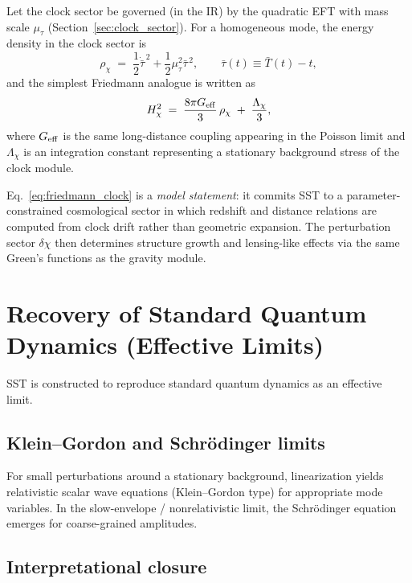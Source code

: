 \documentclass[10pt]{article}
\begin{document}
Let the clock sector be governed (in the IR) by the quadratic EFT with mass scale
$\mu_\tau$ (Section~\ref{sec:clock_sector}). For a homogeneous mode, the energy density
in the clock sector is
\begin{equation}
    \rho_\chi \;=\; \frac{1}{2}\dot{\bar{\tau}}^{\,2} + \frac{1}{2}\mu_\tau^2\bar{\tau}^{\,2},
    \qquad
    \bar{\tau}(t)\equiv \bar{T}(t)-t,
\end{equation}
and the simplest Friedmann analogue is written as
\begin{equation}
    H_\chi^2 \;=\; \frac{8\pi G_{\rm eff}}{3}\,\rho_\chi \;+\; \frac{\Lambda_\chi}{3},
    \label{eq:friedmann_clock}
\end{equation}
where $G_{\rm eff}$ is the same long-distance coupling appearing in the Poisson limit
and $\Lambda_\chi$ is an integration constant representing a stationary background
stress of the clock module.

Eq.~\eqref{eq:friedmann_clock} is a \emph{model statement}: it commits SST to a
parameter-constrained cosmological sector in which redshift and distance relations
are computed from clock drift rather than geometric expansion. The perturbation
sector $\delta\chi$ then determines structure growth and lensing-like effects via
the same Green's functions as the gravity module.


\section{Recovery of Standard Quantum Dynamics (Effective Limits)}
    \label{sec:qm_limits}

    SST is constructed to reproduce standard quantum dynamics as an effective limit.

    \subsection{Klein--Gordon and Schr\"odinger limits}

        For small perturbations around a stationary background, linearization yields
        relativistic scalar wave equations (Klein--Gordon type) for appropriate mode
        variables. In the slow-envelope / nonrelativistic limit, the Schr\"odinger
        equation emerges for coarse-grained amplitudes.

    \subsection{Interpretational closure}
\end{document}
